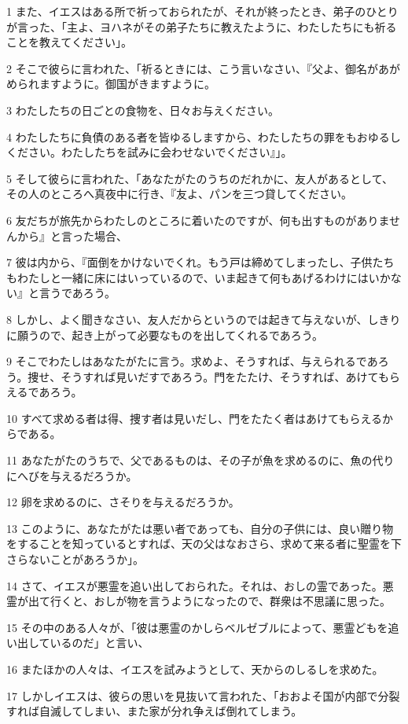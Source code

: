 \par 1 また、イエスはある所で祈っておられたが、それが終ったとき、弟子のひとりが言った、「主よ、ヨハネがその弟子たちに教えたように、わたしたちにも祈ることを教えてください」。
\par 2 そこで彼らに言われた、「祈るときには、こう言いなさい、『父よ、御名があがめられますように。御国がきますように。
\par 3 わたしたちの日ごとの食物を、日々お与えください。
\par 4 わたしたちに負債のある者を皆ゆるしますから、わたしたちの罪をもおゆるしください。わたしたちを試みに会わせないでください』」。
\par 5 そして彼らに言われた、「あなたがたのうちのだれかに、友人があるとして、その人のところへ真夜中に行き、『友よ、パンを三つ貸してください。
\par 6 友だちが旅先からわたしのところに着いたのですが、何も出すものがありませんから』と言った場合、
\par 7 彼は内から、『面倒をかけないでくれ。もう戸は締めてしまったし、子供たちもわたしと一緒に床にはいっているので、いま起きて何もあげるわけにはいかない』と言うであろう。
\par 8 しかし、よく聞きなさい、友人だからというのでは起きて与えないが、しきりに願うので、起き上がって必要なものを出してくれるであろう。
\par 9 そこでわたしはあなたがたに言う。求めよ、そうすれば、与えられるであろう。捜せ、そうすれば見いだすであろう。門をたたけ、そうすれば、あけてもらえるであろう。
\par 10 すべて求める者は得、捜す者は見いだし、門をたたく者はあけてもらえるからである。
\par 11 あなたがたのうちで、父であるものは、その子が魚を求めるのに、魚の代りにへびを与えるだろうか。
\par 12 卵を求めるのに、さそりを与えるだろうか。
\par 13 このように、あなたがたは悪い者であっても、自分の子供には、良い贈り物をすることを知っているとすれば、天の父はなおさら、求めて来る者に聖霊を下さらないことがあろうか」。
\par 14 さて、イエスが悪霊を追い出しておられた。それは、おしの霊であった。悪霊が出て行くと、おしが物を言うようになったので、群衆は不思議に思った。
\par 15 その中のある人々が、「彼は悪霊のかしらベルゼブルによって、悪霊どもを追い出しているのだ」と言い、
\par 16 またほかの人々は、イエスを試みようとして、天からのしるしを求めた。
\par 17 しかしイエスは、彼らの思いを見抜いて言われた、「おおよそ国が内部で分裂すれば自滅してしまい、また家が分れ争えば倒れてしまう。
